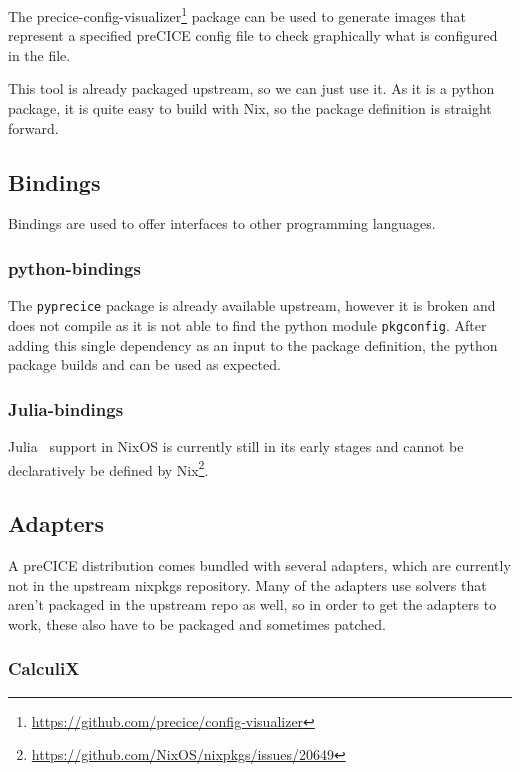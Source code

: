 \documentclass{eceasst}
\begin{document}
The precice-config-visualizer\footnote{\url{https://github.com/precice/config-visualizer}} package can be used to generate images that represent a specified preCICE config file to check graphically what is configured in the file.

This tool is already packaged upstream, so we can just use it.
As it is a python package, it is quite easy to build with Nix, so the package definition is straight forward.

\subsection{Bindings}

Bindings are used to offer interfaces to other programming languages.

\subsubsection{python-bindings}

The \texttt{pyprecice} package is already available upstream, however it is broken and does not compile as it is not able to find the python module \texttt{pkgconfig}.
After adding this single dependency as an input to the package definition, the python package builds and can be used as expected.

\subsubsection{Julia-bindings}

Julia~\cite{bezanson2017julia} support in NixOS is currently still in its early stages and cannot be declaratively be defined by Nix\footnote{\url{https://github.com/NixOS/nixpkgs/issues/20649}}.

\subsection{Adapters}

A preCICE distribution comes bundled with several adapters, which are currently not in the upstream nixpkgs repository.
Many of the adapters use solvers that aren't packaged in the upstream repo as well, so in order to get the adapters to work, these also have to be packaged and sometimes patched.

\subsubsection{CalculiX}
\end{document}

